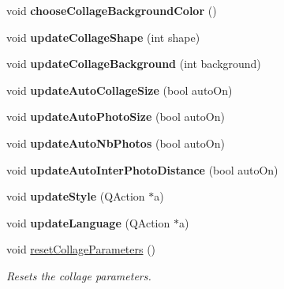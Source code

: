 \begin{DoxyCompactItemize}
\item 
\hypertarget{class_main_window_a7a524bc1193c2706533a3a11b5e819dd}{
void {\bfseries chooseCollageBackgroundColor} ()}
\label{class_main_window_a7a524bc1193c2706533a3a11b5e819dd}

\item 
\hypertarget{class_main_window_a438abfee706b0baa4da9e7a46afcea68}{
void {\bfseries updateCollageShape} (int shape)}
\label{class_main_window_a438abfee706b0baa4da9e7a46afcea68}

\item 
\hypertarget{class_main_window_a3780329fa4c5284ceedddbef2feb9033}{
void {\bfseries updateCollageBackground} (int background)}
\label{class_main_window_a3780329fa4c5284ceedddbef2feb9033}

\item 
\hypertarget{class_main_window_a48ee0dbf0b5caadb9213fd56be66660c}{
void {\bfseries updateAutoCollageSize} (bool autoOn)}
\label{class_main_window_a48ee0dbf0b5caadb9213fd56be66660c}

\item 
\hypertarget{class_main_window_adfc4293395f454a35ae47a306cc82e1e}{
void {\bfseries updateAutoPhotoSize} (bool autoOn)}
\label{class_main_window_adfc4293395f454a35ae47a306cc82e1e}

\item 
\hypertarget{class_main_window_a8ae8906247c327cf9091bc162a2702c5}{
void {\bfseries updateAutoNbPhotos} (bool autoOn)}
\label{class_main_window_a8ae8906247c327cf9091bc162a2702c5}

\item 
\hypertarget{class_main_window_aff6725212824788ecb78bd0889c9ecdb}{
void {\bfseries updateAutoInterPhotoDistance} (bool autoOn)}
\label{class_main_window_aff6725212824788ecb78bd0889c9ecdb}

\item 
\hypertarget{class_main_window_acb1962d7d2137afad973af734debe7f4}{
void {\bfseries updateStyle} (QAction $\ast$a)}
\label{class_main_window_acb1962d7d2137afad973af734debe7f4}

\item 
\hypertarget{class_main_window_a905406b6275b57de766f14370b73f79c}{
void {\bfseries updateLanguage} (QAction $\ast$a)}
\label{class_main_window_a905406b6275b57de766f14370b73f79c}

\item 
\hypertarget{class_main_window_a3836a02807c0c7a2d81b74844ea08e94}{
void \hyperlink{class_main_window_a3836a02807c0c7a2d81b74844ea08e94}{resetCollageParameters} ()}
\label{class_main_window_a3836a02807c0c7a2d81b74844ea08e94}

\begin{DoxyCompactList}\small\item\em Resets the collage parameters. \item\end{DoxyCompactList}\end{DoxyCompactItemize}

